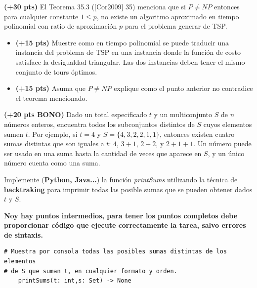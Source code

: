 \documentclass[12pt, a4paper]{exam}
\begin{document}
\begin{questions}
    \question \textbf{(+30 pts)} El Teorema 35.3 ([Cor2009] 35) menciona que si 
    $P \not = NP$ entonces para cualquier constante $1 \leq p$, no existe un algoritmo 
    aproximado en tiempo polinomial  con ratio de aproximación $p$ para el problema 
    generar de TSP. 
	\begin{itemize}
		\item \textbf{(+15 pts)} Muestre como en tiempo polinomial se puede traducir una 
		instancia del problema de TSP en una instancia donde la función de costo satisface 
        la desigualdad triangular. Las dos instancias deben tener el mismo conjunto de tours óptimos. 
		\item \textbf{(+15 pts)} Asuma que $P \not = NP$ explique como el punto anterior 
        no contradice el teorema mencionado. 
	\end{itemize}


    \question \textbf{(+20 pts BONO)} 
    Dado un total especificado \( t \) y un multiconjunto \( S \) de \( n \) números 
    enteros, encuentra todos los subconjuntos distintos de \( S \) cuyos elementos sumen 
    \( t \). Por ejemplo, si \( t = 4 \) y \( S = \{4, 3, 2, 2, 1, 1\} \), entonces 
    existen cuatro sumas distintas que son iguales a \( t \): \( 4 \), \( 3 + 1 \),
    \( 2 + 2 \), y \( 2 + 1 + 1 \). Un número puede ser usado en una suma hasta la 
    cantidad de veces que aparece en \( S \), y un único número cuenta como una suma.

    Implemente (\textbf{Python, Java...})  la función \textit{printSums}
    utilizando la técnica de \textbf{backtraking} para imprimir todas las posible sumas 
    que se pueden obtener dados $t$ y $S$.

    \textbf{Noy hay puntos intermedios, para tener los puntos 
    completos debe proporcionar código que ejecute correctamente la tarea, 
    salvo errores de sintaxis.}
    
    \begin{verbatim}
# Muestra por consola todas las posibles sumas distintas de los elementos 
# de S que suman t, en cualquier formato y orden.
    printSums(t: int,s: Set) -> None
    \end{verbatim}

\end{questions}
\end{document}
